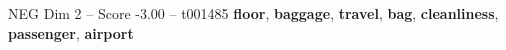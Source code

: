 \begin{textsample}{NEG Dim 2 – Score -3.00 – t001485}  \label{ex:f2_neg_026}
\textbf{floor}, \textbf{baggage}, \textbf{travel}, \textbf{bag}, \textbf{cleanliness}, \textbf{passenger}, \textbf{airport}

\end{textsample}
